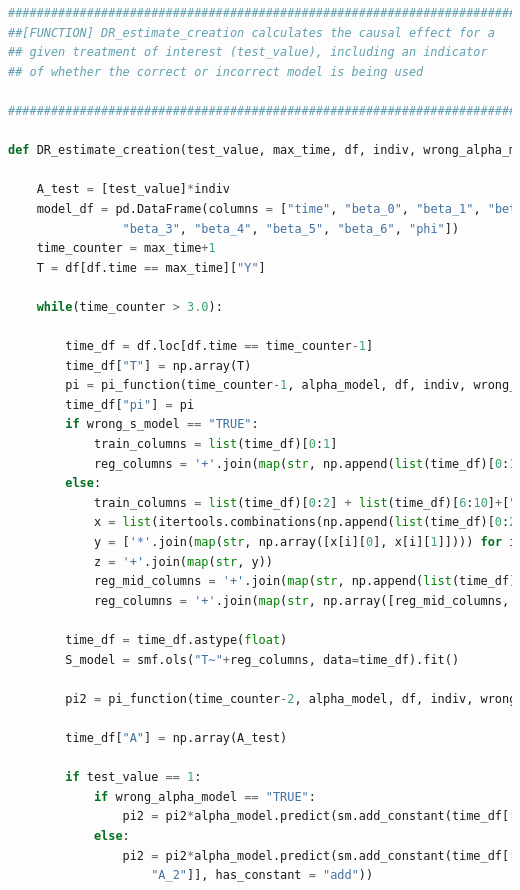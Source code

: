 \begin{lstlisting}[language=Python]
#########################################################################
##[FUNCTION] DR_estimate_creation calculates the causal effect for a 
## given treatment of interest (test_value), including an indicator 
## of whether the correct or incorrect model is being used 

#########################################################################

def DR_estimate_creation(test_value, max_time, df, indiv, wrong_alpha_model, wrong_s_model, alpha_model):
    
    A_test = [test_value]*indiv 
    model_df = pd.DataFrame(columns = ["time", "beta_0", "beta_1", "beta_2", \
                "beta_3", "beta_4", "beta_5", "beta_6", "phi"])
    time_counter = max_time+1
    T = df[df.time == max_time]["Y"]

    while(time_counter > 3.0): 
        
        time_df = df.loc[df.time == time_counter-1]
        time_df["T"] = np.array(T)
        pi = pi_function(time_counter-1, alpha_model, df, indiv, wrong_alpha_model) 
        time_df["pi"] = pi 
        if wrong_s_model == "TRUE":
            train_columns = list(time_df)[0:1]
            reg_columns = '+'.join(map(str, np.append(list(time_df)[0:1],["pi"])))
        else: 
            train_columns = list(time_df)[0:2] + list(time_df)[6:10]+["pi"]
            x = list(itertools.combinations(np.append(list(time_df)[0:2], list(time_df)[6:10]), 2))
            y = ['*'.join(map(str, np.array([x[i][0], x[i][1]]))) for i in range(len(x))]
            z = '+'.join(map(str, y))
            reg_mid_columns = '+'.join(map(str, np.append(list(time_df)[0:2], np.append(list(time_df)[6:10],["pi"]))))
            reg_columns = '+'.join(map(str, np.array([reg_mid_columns, z])))

        time_df = time_df.astype(float)
        S_model = smf.ols("T~"+reg_columns, data=time_df).fit()
        
        pi2 = pi_function(time_counter-2, alpha_model, df, indiv, wrong_alpha_model)
        
        time_df["A"] = np.array(A_test)
        
        if test_value == 1: 
            if wrong_alpha_model == "TRUE":
                pi2 = pi2*alpha_model.predict(sm.add_constant(time_df[["L1_3", "A_3"]], has_constant = "add"))
            else:
                pi2 = pi2*alpha_model.predict(sm.add_constant(time_df[["L1", "L1_1", "A_1", \
                    "A_2"]], has_constant = "add"))
                

\end{lstlisting}
